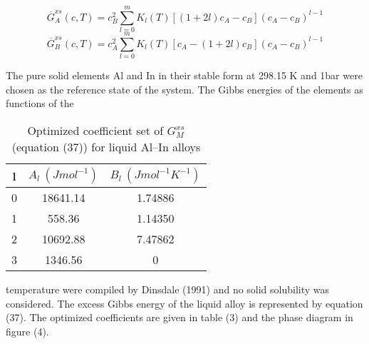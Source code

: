 \documentclass[12pt]{article}
\newcommand*{\1}{\hspace{1pt}}
\begin{document}
    \begin{equation}
        \overline{G}^{xs}_A{(c, T)} = c _B^{2}\sum_{l = 0}^{m} K _l{(T)}[(1 + 2l)c_A - c _B](c_A - c _B)^{l-1}  
    \end{equation}
    \begin{equation}
        \overline{G}^{xs}_B{(c, T)} = c _A^{2}\sum_{l = 0}
        ^{m} K _l{(T)}[c_A - (1 + 2l)c _B](c_A - c _B)^{l-1}  
    \end{equation}

The pure solid elements Al and In in their stable form at 298.15 K 
and 1bar were chosen as the reference state of the system. 
The Gibbs energies of the elements as functions of the \\

\begin{adjustbox}{center,caption={calculated phase diagram 
    (continuous curve) using the coefficient set given in 
    table 3.
    },label={somelabel},nofloat=figure,vspace=\bigskipamount}
\end{adjustbox}
\begin{table}[t!]
    \centering
    \caption{Optimized coefficient set of $G ^ {xs} _ {M}$ 
    (equation (37)) for liquid Al–In alloys}
     \begin{tabular}{|c c c|} 
     \hline
     l & $A_l \ (J mol^{-1})$ & $B_l \ (J mol^{-1}K^{-1})$ \\ [0.5ex] 
     \hline\hline
     0 & 18641.14 & 1.74886  \\ 
     1 & 558.36 & 1.14350  \\
     2 & 10692.88 & 7.47862  \\
     3 & 1346.56 & 0 \\ [1ex] 
     \hline
     \end{tabular}
    \end{table}
\begin{adjustbox}{center,caption={Calculated enthalpy of mixing 
    (continuous curve) using the coefficient set given in
    table 3.},label={somelabel},nofloat=figure,vspace=\bigskipamount}
\end{adjustbox}

temperature were compiled by Dinsdale (1991) and no solid 
solubility was considered. The excess Gibbs energy of the 
liquid alloy is represented by equation (37). The optimized 
coefficients are given in table (3) and the phase diagram in 
figure (4).\\
\end{document}
